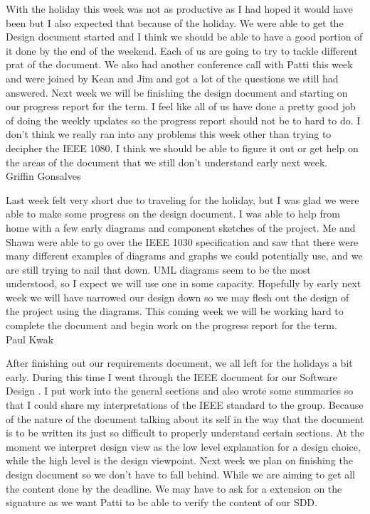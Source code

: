 \documentclass[letterpaper, 10pt, draftclsnofoot, compsoc, onecolumn]{IEEEtran}
\begin{document}
With the holiday this week was not as productive as I had hoped it would have been but I also expected that because of the holiday. We were able to get the Design document started and I think we should be able to have a good portion of it done by the end of the weekend. Each of us are going to try to tackle different prat of the document. We also had another conference call with Patti this week and were joined by Kean and Jim and got a lot of the questions we still had answered. Next week we will be finishing the design document and starting on our progress report for the term. I feel like all of us have done a pretty good job of doing the weekly updates so the progress report should not be to hard to do. I don't think we really ran into any problems this week other than trying to decipher the IEEE 1080. I think we should be able to figure it out or get help on the areas of the document that we still don't understand early next week.\\

Griffin Gonsalves

Last week felt very short due to traveling for the holiday, but I was glad we were able to make some progress on the design document. I was able to help from home with a few early diagrams and component sketches of the project. Me and Shawn were able to go over the IEEE 1030 specification and saw that there were many different examples of diagrams and graphs we could potentially use, and we are still trying to nail that down. UML diagrams seem to be the most understood, so I expect we will use one in some capacity. Hopefully by early next week we will have narrowed our design down so we may flesh out the design of the project using the diagrams. This coming week we will be working hard to complete the document and begin work on the progress report for the term.\\

Paul Kwak

After finishing out our requirements document, we all left for the holidays a bit early. During this time I went through the IEEE document for our Software Design . I put work into the general sections and also wrote some summaries so that I could share my interpretations of the IEEE standard to the group. Because of the nature of the document talking about its self in the way that the document is to be written its just so difficult to properly understand certain sections. At the moment we interpret design view as the low level explanation for a design choice, while the high level is the design viewpoint. Next week we plan on finishing the design document so we don't have to fall behind. While we are aiming to get all the content done by the deadline. We may have to ask for a extension on the signature as we want Patti to be able to verify the content of our SDD.\\
\end{document}
